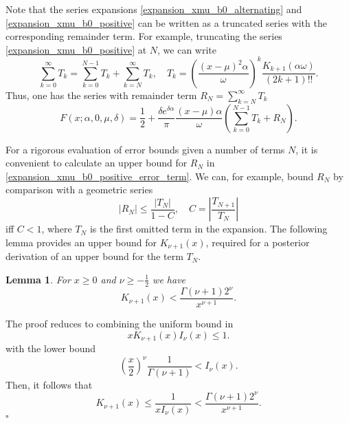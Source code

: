 \documentclass[10pt,a4paper,oneside]{article}
\newtheorem{lemma}[theorem]{Lemma}
\newenvironment{proof}{\noindent{\bf Proof:}}{\hfill$\square$}
\numberwithin{equation}{section}
\begin{document}
Note that the series expansions \eqref{expansion_xmu_b0_alternating} and \eqref{expansion_xmu_b0_positive} can be written as a truncated series with the corresponding remainder term. For example, truncating the series \eqref{expansion_xmu_b0_positive} at $N$, we can write
\begin{equation}\label{expansion_xmu_b0_positive_error_term}
\sum_{k=0}^{\infty} T_k = \sum_{k=0}^{N-1} T_k + \sum_{k=N}^{\infty}T_k, \quad T_k = \left(\frac{(x-\mu)^2 \alpha}{\omega}\right)^k \frac{K_{k+1}(\alpha \omega)}{(2k +1)!!}.
\end{equation}
Thus, one has the series with remainder term $R_N = \sum_{k=N}^{\infty}T_k$
\begin{equation}\label{expansion_xmu_b0_positive_with_remainder}
F(x; \alpha, 0, \mu, \delta) = \frac{1}{2} + \frac{\delta e^{\delta \alpha}}{\pi}\frac{(x-\mu)\alpha}{\omega}\left(\sum_{k=0}^{N-1}T_k + R_N\right).
\end{equation}

For a rigorous evaluation of error bounds given a number of terms $N$, it is convenient to calculate an upper bound for $R_N$ in \eqref{expansion_xmu_b0_positive_error_term}. We can, for example, bound $R_N$ by comparison with a geometric series
\begin{equation}
\left|R_N \right| \le \frac{|T_N|}{1 - C}, \quad C = \left|\frac{T_{N+1}}{T_N}\right|
\end{equation}
iff $C < 1$, where $T_N$ is the first omitted term in the expansion. The following lemma provides an upper bound for $K_{\nu+1}(x)$, required for a posterior derivation of an upper bound for the term $T_N$.
\begin{lemma}\label{lemma_1}
For $x \ge 0$ and $\nu \ge -\frac{1}{2}$ we have
\begin{equation}
K_{\nu + 1}(x) < \frac{\Gamma(\nu + 1)2^{\nu}}{x^{\nu + 1}}.
\end{equation}
\end{lemma}
\begin{proof}
The proof reduces to combining the uniform bound in \cite{Gaunt2016}
\begin{equation}
x K_{\nu + 1}(x) I_{\nu}(x) \le 1.
\end{equation}
with the lower bound \cite{Luke1972}
\begin{equation}
\left(\frac{x}{2}\right)^{\nu}\frac{1}{\Gamma(\nu + 1)} < I_{\nu}(x).
\end{equation}
Then, it follows that
\begin{equation}
K_{\nu + 1}(x) \le \frac{1}{x I_{\nu}(x)} < \frac{\Gamma(\nu + 1)2^{\nu}}{x^{\nu + 1}}.
\end{equation}
\end{proof}
\end{document}
